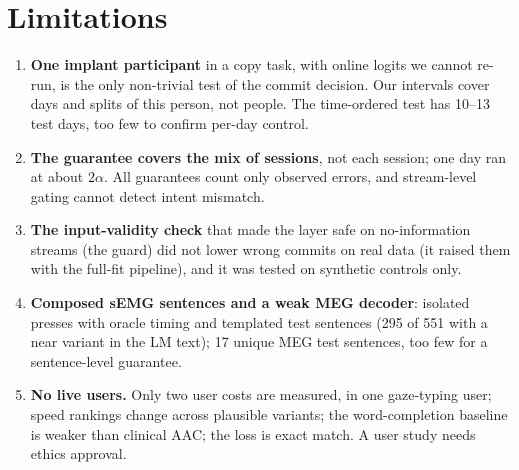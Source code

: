 \section{Limitations}
\label{sec:limitations}

\begin{enumerate}[leftmargin=*,itemsep=0pt]
  \item \textbf{One implant participant} in a copy task, with online logits we cannot re-run, is the only non-trivial test of the commit decision. Our intervals cover days and splits of this person, not people. The time-ordered test has 10--13 test days, too few to confirm per-day control.
  \item \textbf{The guarantee covers the mix of sessions}, not each session; one day ran at about $2\alpha$. All guarantees count only observed errors, and stream-level gating cannot detect intent mismatch.
  \item \textbf{The input-validity check} that made the layer safe on no-information streams (the guard) did not lower wrong commits on real data (it raised them with the full-fit pipeline), and it was tested on synthetic controls only.
  \item \textbf{Composed sEMG sentences and a weak MEG decoder}: isolated presses with oracle timing and templated test sentences (295 of 551 with a near variant in the LM text); 17 unique MEG test sentences, too few for a sentence-level guarantee.
  \item \textbf{No live users.} Only two user costs are measured, in one gaze-typing user; speed rankings change across plausible variants; the word-completion baseline is weaker than clinical AAC; the loss is exact match. A user study needs ethics approval.
\end{enumerate}
